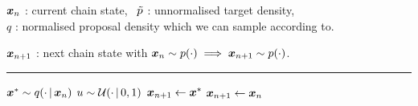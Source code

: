 \begin{algorithmic}
\small
    \Require
    $\boldsymbol{x}_n$ : current chain state,~
    $\tilde{p}$ : unnormalised target density,\\
    $q$ : normalised proposal density which we can sample according to.
    \Ensure\raggedright
    $\boldsymbol{x}_{n+1}$ : next chain state with $\boldsymbol{x}_n \sim p(\cdot) \implies \boldsymbol{x}_{n+1} \sim p(\cdot)$.
\end{algorithmic}
\hrule
\small
\begin{algorithmic}[1]
  \State $\boldsymbol{x}^* \sim q(\cdot \operatorname{|} \boldsymbol{x}_{n})$ 
  \State $u \sim \mathcal{U}(\cdot \operatorname{|} 0,1)$
  \vspace{0.2mm}
    \vspace{0.1mm}
    \State $\boldsymbol{x}_{n+1} \gets \boldsymbol{x}^*$ 
  \Else
    \State $\boldsymbol{x}_{n+1} \gets \boldsymbol{x}_{n}$ 
  \EndIf
\end{algorithmic}

